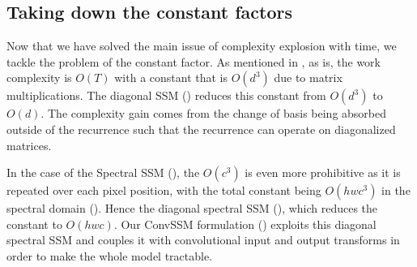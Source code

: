 \documentclass{article}
\begin{document}
\subsection{Taking down the constant factors}
\label{app:constant_factors}

Now that we have solved the main issue of complexity explosion with time, we tackle the problem of the constant factor. As mentioned in , as is, the work complexity is $O(T)$ with a constant that is $O(d^3)$ due to matrix multiplications.
%
The diagonal SSM () reduces this constant from $O(d^3)$ to $O(d)$. The complexity gain comes from the change of basis being absorbed outside of the recurrence such that the recurrence can operate on diagonalized matrices.

In the case of the Spectral SSM (), the $O(c^3)$ is even more prohibitive as it is repeated over each pixel position, with the total constant being $O(hwc^3)$ in the spectral domain (). Hence the diagonal spectral SSM (), which reduces the constant to $O(hwc)$. Our ConvSSM formulation () exploits this diagonal spectral SSM and couples it with convolutional input and output transforms in order to make the whole model tractable.
\end{document}
